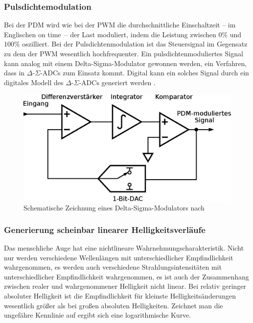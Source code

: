 \documentclass[12pt,a4paper,notitlepage]{article}
\begin{document}
\subsubsection{Pulsdichtemodulation}
Bei der \gls{PDM} wird wie bei der \gls{PWM} die durchschnittliche Einschaltzeit -- im Englischen \glqq on time\grqq\ -- der Last moduliert, indem die Leistung zwischen $0\%$ und $100\%$ oszilliert. Bei der Pulsdichtenmodulation ist das Steuersignal im Gegensatz zu dem der PWM wesentlich hochfrequenter. Ein pulsdichtenmoduliertes Signal kann analog mit einem Delta-Sigma-Modulator gewonnen werden, ein Verfahren, dass in $\Delta$-$\Sigma$-ADCs zum Einsatz kommt. \cite{MAXIM21, MAXIM10} Digital kann ein solches Signal durch ein digitales Modell des $\Delta$-$\Sigma$-ADCs generiert werden \cite{WP1, WP3}.
\begin{figure}
\begin{center}
\includegraphics{images/delta-sigma-adc.eps}
\caption{Schematische Zeichnung eines Delta-Sigma-Modulators nach \cite{MAXIM21}}
\label{delta-sigma-modulator}
\end{center}
\end{figure}

\subsubsection{Generierung scheinbar linearer Helligkeitsverläufe}
Das menschliche Auge hat eine nichtlineare Wahrnehmungscharakteristik. Nicht nur werden verschiedene Wellenlängen mit unterschiedlicher Empfindlichkeit wahrgenommen, es werden auch verschiedene Strahlungsintensitäten mit unterschiedlicher Empfindlichkeit wahrgenommen, es ist auch der Zusammenhang zwischen realer und wahrgenommener Helligkeit nicht linear. Bei relativ geringer absoluter Helligkeit ist die Empfindlichkeit für kleinste Helligkeitsänderungen wesentlich größer als bei großen absoluten Helligkeiten. Zeichnet man die ungefähre Kennlinie auf ergibt sich eine logarithmische Kurve.
\end{document}
